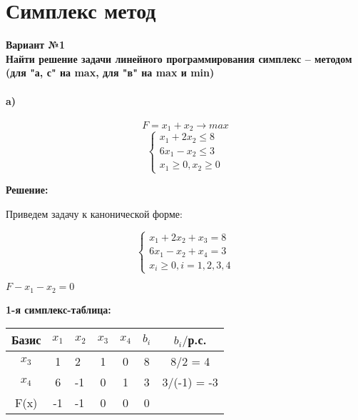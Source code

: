 \chapter{Симплекс метод}

{\bf Вариант №1\\Найти решение задачи линейного программирования симплекс – методом (для "а, с" на max, для "в" на max и min)}

\subsubsection{a)}
\begin{equation*}
    F = x_1 + x_2 \rightarrow max
\end{equation*}
\begin{equation*}
    \begin{cases}
        x_1 + 2x_2 \le 8 \\
        6x_1 - x_2 \le 3 \\
        x_1 \ge 0, x_2 \ge 0
    \end{cases}
\end{equation*}

\begin{center}
    {\bf
    Решение:}
\end{center}

\begin{flushleft}
Приведем задачу к канонической форме:
\end{flushleft}

\begin{equation*}
    \begin{cases}
        x_1 + 2x_2 + x_3 = 8 \\
        6x_1 - x_2 + x_4 = 3 \\
        x_i \ge 0, i = 1, 2, 3, 4
    \end{cases}
\end{equation*}
\begin{center}
    $F - x_1 - x_2 = 0$
\end{center}

\begin{flushleft}
    {\bf1-я симплекс-таблица:}\\
\end{flushleft}

\begin{center}
    \begin{tabular}{|c | c g c c c c|} 
         \hline
            Базис & $x_1$ & $x_2$ & $x_3$ & $x_4$ & $b_i$ & $b_i/$р.с.\\
         \hline
            $x_3$ & 1 & 2 & 1 & 0 & 8 & 8/2 = 4\\
         \hline
            $x_4$ & 6 & -1 & 0 & 1 & 3 & 3/(-1) = -3\\
         \hline
            F(x) & -1 & -1 & 0 & 0 & 0 &\\
         \hline
    \end{tabular}
\end{center}

